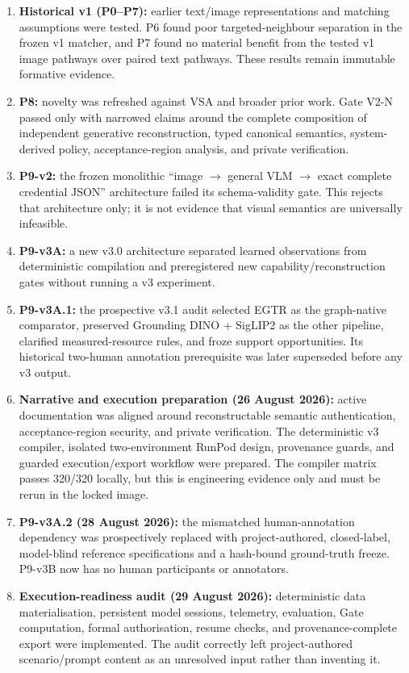 \documentclass[11pt,a4paper]{article}
\begin{document}
\begin{enumerate}
  \item \textbf{Historical v1 (P0--P7):} earlier text/image representations and matching assumptions were tested. P6 found poor targeted-neighbour separation in the frozen v1 matcher, and P7 found no material benefit from the tested v1 image pathways over paired text pathways. These results remain immutable formative evidence.
  \item \textbf{P8:} novelty was refreshed against VSA and broader prior work. Gate V2-N passed only with narrowed claims around the complete composition of independent generative reconstruction, typed canonical semantics, system-derived policy, acceptance-region analysis, and private verification.
  \item \textbf{P9-v2:} the frozen monolithic ``image $\rightarrow$ general VLM $\rightarrow$ exact complete credential JSON'' architecture failed its schema-validity gate. This rejects that architecture only; it is not evidence that visual semantics are universally infeasible.
  \item \textbf{P9-v3A:} a new v3.0 architecture separated learned observations from deterministic compilation and preregistered new capability/reconstruction gates without running a v3 experiment.
  \item \textbf{P9-v3A.1:} the prospective v3.1 audit selected EGTR as the graph-native comparator, preserved Grounding DINO + SigLIP2 as the other pipeline, clarified measured-resource rules, and froze support opportunities. Its historical two-human annotation prerequisite was later superseded before any v3 output.
  \item \textbf{Narrative and execution preparation (26 August 2026):} active documentation was aligned around reconstructable semantic authentication, acceptance-region security, and private verification. The deterministic v3 compiler, isolated two-environment RunPod design, provenance guards, and guarded execution/export workflow were prepared. The compiler matrix passes 320/320 locally, but this is engineering evidence only and must be rerun in the locked image.
  \item \textbf{P9-v3A.2 (28 August 2026):} the mismatched human-annotation dependency was prospectively replaced with project-authored, closed-label, model-blind reference specifications and a hash-bound ground-truth freeze. P9-v3B now has no human participants or annotators.
  \item \textbf{Execution-readiness audit (29 August 2026):} deterministic data materialisation, persistent model sessions, telemetry, evaluation, Gate computation, formal authorisation, resume checks, and provenance-complete export were implemented. The audit correctly left project-authored scenario/prompt content as an unresolved input rather than inventing it.

\end{enumerate}
\end{document}
